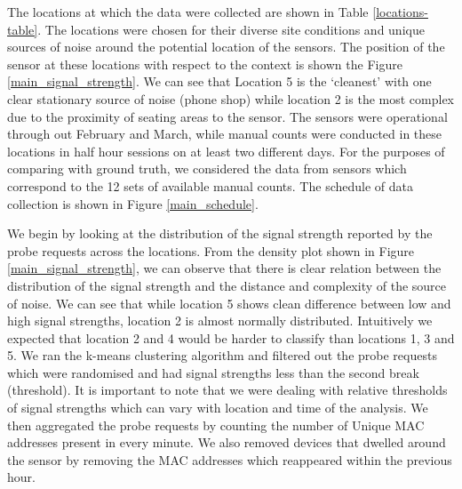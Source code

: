 The locations at which the data were collected are shown in Table
\ref{locations-table}. The locations were chosen for their diverse site
conditions and unique sources of noise around the potential location of the
sensors. The position of the sensor at these locations with respect to the
context is shown the Figure \ref{main_signal_strength}. We can see that
Location 5 is the `cleanest' with one clear stationary source of noise (phone
shop) while location 2 is the most complex due to the proximity of seating
areas to the sensor.  The sensors were operational through out February and
March, while manual counts were conducted in these locations in half hour
sessions on at least two different days. For the purposes of comparing with
ground truth, we considered the data from sensors which correspond to the 12
sets of available manual counts. The schedule of data collection is shown in
Figure \ref{main_schedule}.


We begin by looking at the distribution of the signal strength reported by the
probe requests across the locations. From the density plot shown in Figure
\ref{main_signal_strength}, we can observe that there is clear relation between
the distribution of the signal strength and the distance and complexity of the
source of noise. We can see that while location 5 shows clean difference
between low and high signal strengths, location 2 is almost normally
distributed.  Intuitively we expected that location 2 and 4 would be harder to
classify than locations 1, 3 and 5.  We ran the k-means clustering algorithm
and filtered out the probe requests which were randomised and had signal
strengths less than the second break (threshold).  It is important to note that
we were dealing with relative thresholds of signal strengths which can vary
with location and time of the analysis.  We then aggregated the probe requests
by counting the number of Unique MAC addresses present in every minute. We also
removed devices that dwelled around the sensor by removing the MAC
addresses which reappeared within the previous hour.


